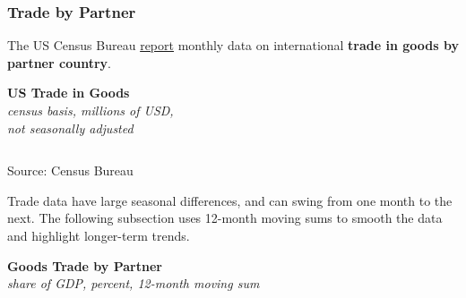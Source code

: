 \documentclass{report}
\begin{document}
{\begin{minipage}{1.0\textwidth} 
\subsubsection*{Trade by Partner} 
\small The US Census Bureau \href{https://www.census.gov/foreign-trade/data/index.html}{report} monthly data on international \textbf{trade in goods by partner country}.  
\vspace{1.5mm}

\normalsize \textbf{US Trade in Goods} \hspace{12mm}  \hspace{16mm} \\
\footnotesize{\textit{census basis, millions of USD,}}\\
\footnotesize{\textit{not seasonally adjusted}}\\
 \setlength{\tabcolsep}{3.2pt} \color{black!90}
	{\renewcommand{\arraystretch}{1.5}
\hspace*{-2mm} \begin{tabular}{p{28mm} R{12mm} R{12mm} R{12mm} R{14.5mm} R{12mm} R{12mm}}
			  \hline
		\end{tabular}}	
\vspace*{-2mm}	
	
\footnotesize{Source: Census Bureau}
\vspace{0.5mm}

\small 

Trade data have large seasonal differences, and can swing from one month to the next. The following subsection uses 12-month moving sums to smooth the data and highlight longer-term trends.
\end{minipage}
\newpage
\vspace*{-9mm}  

\begin{minipage}{0.79\textwidth}
\small 
\vspace{1mm}

\normalsize \textbf{Goods Trade by Partner}\\
\footnotesize{\textit{share of GDP, percent, 12-month moving sum}}
\vspace{3.35cm}


\end{minipage}}
\end{document}
